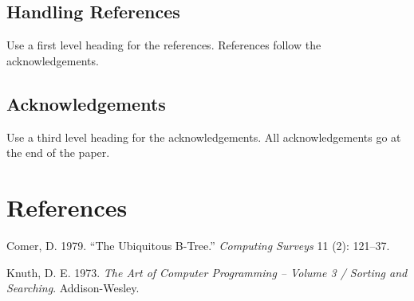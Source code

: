 \documentclass[a4paper]{article}
\begin{document}
\hypertarget{handling-references}{%
\subsection{Handling References}\label{handling-references}}

Use a first level heading for the references. References follow the
acknowledgements.

\hypertarget{acknowledgements}{%
\subsection{Acknowledgements}\label{acknowledgements}}

Use a third level heading for the acknowledgements. All acknowledgements
go at the end of the paper.

\hypertarget{references}{%
\section*{References}\label{references}}

\hypertarget{refs}{}
\leavevmode\hypertarget{ref-Comer-btree}{}%
Comer, D. 1979. ``The Ubiquitous B-Tree.'' \emph{Computing Surveys} 11
(2): 121--37.

\leavevmode\hypertarget{ref-Knuth-vol3}{}%
Knuth, D. E. 1973. \emph{The Art of Computer Programming -- Volume 3 /
Sorting and Searching}. Addison-Wesley.



\end{document}
